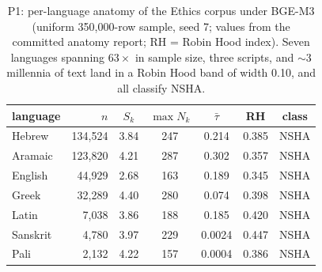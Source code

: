 \documentclass[11pt]{article}
\newcommand{\sk}{S_k}
\newcommand{\tmean}{\bar{\tau}}
\begin{document}
\begin{table}[t]
\centering
\small
\setlength{\tabcolsep}{3pt}
\begin{tabular}{lrccccc}
\toprule
language & $n$ & $\sk$ & $\max N_k$ & $\tmean$ & RH & class \\
\midrule
Hebrew   & 134{,}524 & 3.84 & 247 & 0.214  & 0.385 & NSHA \\
Aramaic  & 123{,}820 & 4.21 & 287 & 0.302  & 0.357 & NSHA \\
English  &  44{,}929 & 2.68 & 163 & 0.189  & 0.345 & NSHA \\
Greek    &  32{,}289 & 4.40 & 280 & 0.074  & 0.398 & NSHA \\
Latin    &   7{,}038 & 3.86 & 188 & 0.185  & 0.420 & NSHA \\
Sanskrit &   4{,}780 & 3.97 & 229 & 0.0024 & 0.447 & NSHA \\
Pali     &   2{,}132 & 4.22 & 157 & 0.0004 & 0.386 & NSHA \\
\bottomrule
\end{tabular}
\caption{P1: per-language anatomy of the Ethics corpus under BGE-M3
(uniform 350{,}000-row sample, seed 7; values from the committed anatomy
report; RH = Robin Hood index). Seven languages spanning $63\times$ in
sample size, three scripts, and $\sim$3 millennia of text land in a Robin
Hood band of width 0.10, and all classify NSHA.}
\label{tab:p1}
\end{table}
\end{document}
